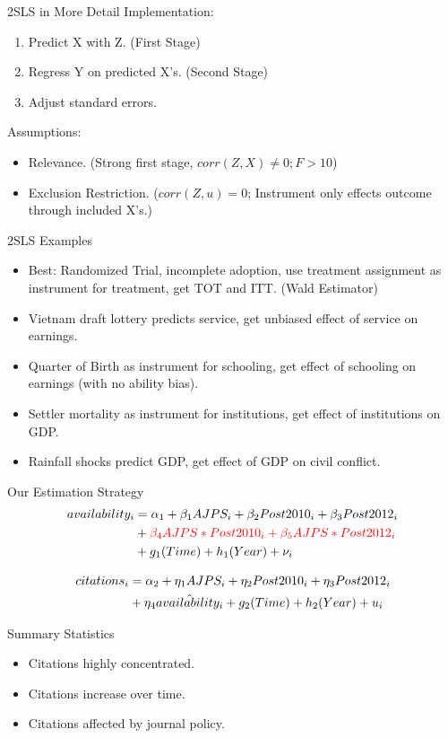 \documentclass{beamer}
\begin{document}
\begin{frame}{2SLS in More Detail}
Implementation: 
\begin{enumerate}
\item Predict X with Z. (First Stage)
\item Regress Y on predicted X's. (Second Stage)
\item Adjust standard errors.
\end{enumerate}
Assumptions:
\begin{itemize}
\item Relevance. (Strong first stage, $corr(Z,X)\neq 0; F>10$)
\item Exclusion Restriction.  ($corr(Z,u)=0$; Instrument only effects outcome through included X's.)
\end{itemize}
\end{frame}

\begin{frame}{2SLS Examples}
\begin{itemize}
\item Best: Randomized Trial, incomplete adoption, use treatment assignment as instrument for treatment, get TOT and ITT. (Wald Estimator)
\item Vietnam draft lottery predicts service, get unbiased effect of service on earnings.
\item Quarter of Birth as instrument for schooling, get effect of schooling on earnings (with no ability bias).
\item Settler mortality as instrument for institutions, get effect of institutions on GDP.
\item Rainfall shocks predict GDP, get effect of GDP on civil conflict.
\end{itemize}
\end{frame}

\begin{frame}{Our Estimation Strategy}
\begin{align}\label{firststage} 
availability_i &= \alpha_1 +\beta_1 AJPS_i + \beta_2 Post2010_i + \beta_3 Post2012_i \\ \notag
& + {\color{red} \beta_4 AJPS*Post2010_i + \beta_5 AJPS*Post2012_i } \\
& + g_1(Time) + h_1(Year) +\nu_i \notag
\end{align}

\begin{align}
citations_i &=\alpha_2 +\eta_1 AJPS_i + \eta_2 Post2010_i+ \eta_3 Post2012_i \\ 
& + \eta_4 \hat{availability_i}+g_2(Time) + h_2(Year) +u_i \notag
\end{align}

\end{frame}
\begin{frame}{Summary Statistics}
\begin{itemize}
\item Citations highly concentrated.
\item Citations increase over time.
\item Citations affected by journal policy.
\end{itemize}
\end{frame}
\end{document}
